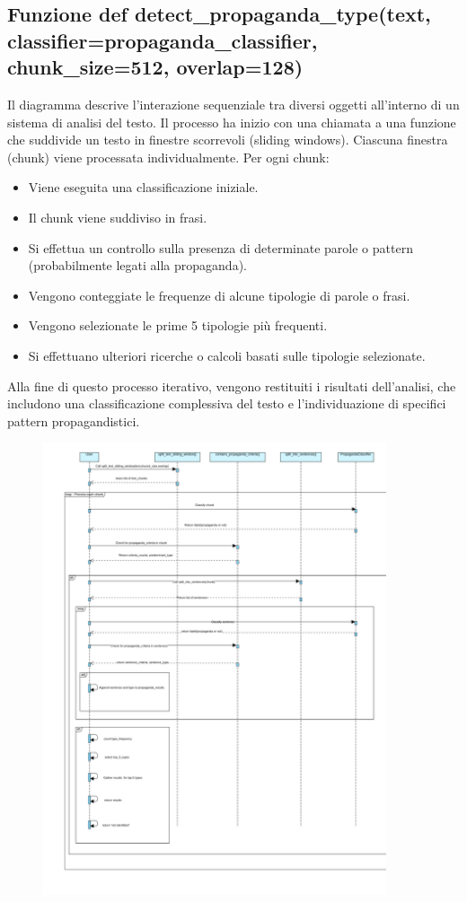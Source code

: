 \documentclass{article}
\begin{document}
	\subsection{Funzione def detect\_propaganda\_type(text, classifier=propaganda\_classifier, chunk\_size=512, overlap=128)}
Il diagramma descrive l'interazione sequenziale tra diversi oggetti all'interno di un sistema di analisi del testo.
Il processo ha inizio con una chiamata a una funzione che suddivide un testo in finestre scorrevoli (sliding windows). Ciascuna finestra (chunk) viene processata individualmente. 
Per ogni chunk:
	\begin{itemize}
		\item Viene eseguita una classificazione iniziale.
		\item Il chunk viene suddiviso in frasi.
		\item Si effettua un controllo sulla presenza di determinate parole o pattern (probabilmente legati alla propaganda).
		\item Vengono conteggiate le frequenze di alcune tipologie di parole o frasi.
		\item Vengono selezionate le prime 5 tipologie più frequenti.
		\item Si effettuano ulteriori ricerche o calcoli basati sulle tipologie selezionate.
	\end{itemize}
Alla fine di questo processo iterativo, vengono restituiti i risultati dell'analisi, che includono una classificazione complessiva del testo e l'individuazione di specifici pattern propagandistici.
	\begin{figure}[H]
		\centering
		\includegraphics[width=0.9\textwidth]{immagini/propagandatype}
	\end{figure}
	
\end{document}
